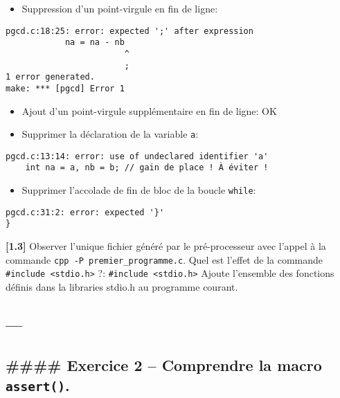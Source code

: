\documentclass[11pt]{article}
\providecommand{\tightlist}{%
      \setlength{\itemsep}{0pt}\setlength{\parskip}{0pt}}
\begin{document}
\begin{itemize}
\tightlist
\item
  Suppression d'un point-virgule en fin de ligne:
\end{itemize}

\begin{verbatim}
pgcd.c:18:25: error: expected ';' after expression
            na = na - nb
                        ^
                        ;
1 error generated.
make: *** [pgcd] Error 1
\end{verbatim}

\begin{itemize}
\tightlist
\item
  Ajout d'un point-virgule supplémentaire en fin de ligne: OK
\item
  Supprimer la déclaration de la variable \texttt{a}:
\end{itemize}

\begin{verbatim}
pgcd.c:13:14: error: use of undeclared identifier 'a'
    int na = a, nb = b; // gain de place ! À éviter !
\end{verbatim}

\begin{itemize}
\tightlist
\item
  Supprimer l'accolade de fin de bloc de la boucle \texttt{while}:
\end{itemize}

\begin{verbatim}
pgcd.c:31:2: error: expected '}'
}
\end{verbatim}

\textbf{{[}1.3{]}} Observer l'unique fichier généré par le
pré-processeur avec l'appel à la commande
\texttt{cpp\ -P\ premier\_programme.c}. Quel est l'effet de la commande
\texttt{\#include\ \textless{}stdio.h\textgreater{}} ?:
\texttt{\#include\ \textless{}stdio.h\textgreater{}} Ajoute l'ensemble
des fonctions définis dans la libraries stdio.h au programme courant.

    \hypertarget{section}{%
\subsection{---}\label{section}}

\hypertarget{exercice-2-comprendre-la-macro-assert.}{%
\subsection{\texorpdfstring{\#\#\#\# Exercice 2 -- Comprendre la macro
\texttt{assert()}.}{\#\#\#\# Exercice 2 -- Comprendre la macro assert().}}\label{exercice-2-comprendre-la-macro-assert.}}
\end{document}
